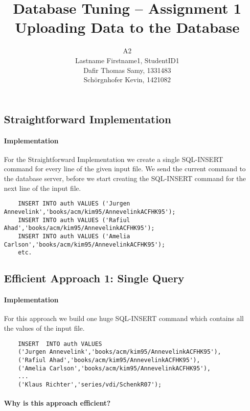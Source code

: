 \documentclass[11pt]{scrartcl}
\title{
  \textbf{\large Database Tuning -- Assignment 1}\\
  Uploading Data to the Database
}
\author{
 A2\\
\large Lastname Firstname1, StudentID1 \\
\large Dafir Thomas Samy, 1331483 \\
\large Sch\"orgnhofer Kevin, 1421082
}
\begin{document}
\maketitle

\subsection*{Straightforward Implementation}

  \paragraph{Implementation}

  For the Straightforward Implementation we create a single SQL-INSERT command for every line of the given input file. We send the current command to the database server, before we start creating the SQL-INSERT command for the next line of the input file.

{\small
\begin{verbatim}
    INSERT INTO auth VALUES ('Jurgen Annevelink','books/acm/kim95/AnnevelinkACFHK95');
    INSERT INTO auth VALUES ('Rafiul Ahad','books/acm/kim95/AnnevelinkACFHK95');
    INSERT INTO auth VALUES ('Amelia Carlson','books/acm/kim95/AnnevelinkACFHK95');
    etc.
\end{verbatim}
}

  \subsection*{Efficient Approach 1: Single Query}

  \paragraph{Implementation}

  For this approach we build one huge SQL-INSERT command which contains all the values of the input file.

{\small
\begin{verbatim}
    INSERT  INTO auth VALUES
    ('Jurgen Annevelink','books/acm/kim95/AnnevelinkACFHK95'),
    ('Rafiul Ahad','books/acm/kim95/AnnevelinkACFHK95'),
    ('Amelia Carlson','books/acm/kim95/AnnevelinkACFHK95'),
    ...
    ('Klaus Richter','series/vdi/SchenkR07');
\end{verbatim}
}

  \paragraph{Why is this approach efficient?}
\end{document}
